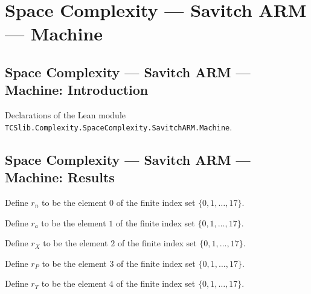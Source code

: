 \section{Space Complexity --- Savitch ARM --- Machine}
\subsection*{Space Complexity --- Savitch ARM --- Machine: Introduction}

Declarations of the Lean module \texttt{TCSlib.Complexity.SpaceComplexity.SavitchARM.Machine}.

\subsection*{Space Complexity --- Savitch ARM --- Machine: Results}

\begin{definition}
\label{Complexity.LogProg.SavitchARM.rn}
\leanok
Define $r_n$ to be the element $0$ of the finite index set $\{0,1,\ldots,17\}$.
\end{definition}

\begin{definition}
\label{Complexity.LogProg.SavitchARM.ra}
\leanok
Define $r_a$ to be the element $1$ of the finite index set $\{0,1,\ldots,17\}$.
\end{definition}

\begin{definition}
\label{Complexity.LogProg.SavitchARM.rX}
\leanok
Define $r_X$ to be the element $2$ of the finite index set $\{0,1,\ldots,17\}$.
\end{definition}

\begin{definition}
\label{Complexity.LogProg.SavitchARM.rP}
\leanok
Define $r_P$ to be the element $3$ of the finite index set $\{0,1,\ldots,17\}$.
\end{definition}

\begin{definition}
\label{Complexity.LogProg.SavitchARM.rT}
\leanok
Define $r_T$ to be the element $4$ of the finite index set $\{0,1,\ldots,17\}$.
\end{definition}

